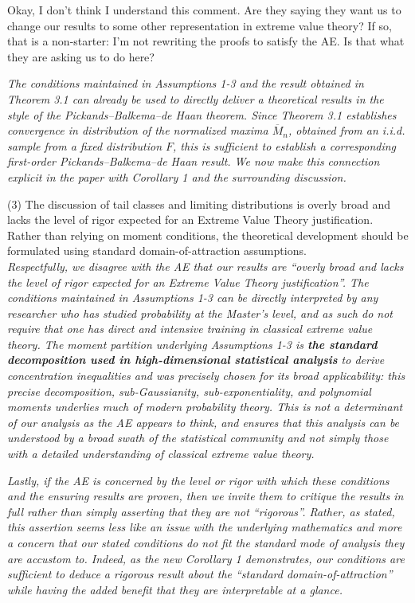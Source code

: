 \documentclass[a4paper,11pt]{article}
\begin{document}
{\color{red}Okay, I don't think I understand this comment. Are they saying they want us to change our results to some other representation in extreme value theory? If so, that is a non-starter: I'm not rewriting the proofs to satisfy the AE. Is that what they are asking us to do here?  }

\textit{The conditions maintained in Assumptions 1-3 and the result obtained in Theorem 3.1 can already be used to directly deliver a theoretical results in the style of the Pickands–Balkema–de Haan theorem. Since Theorem 3.1 establishes convergence in distribution of the normalized maxima $\overline{M}_n$, obtained from an i.i.d. sample from a fixed distribution \(F\), this is sufficient to establish a corresponding first-order Pickands–Balkema–de Haan result. We now make this connection explicit in the paper with Corollary 1 and the surrounding discussion.}

\noindent (3) The discussion of tail classes and limiting distributions is overly broad and lacks the level of rigor expected for an Extreme Value Theory justification. Rather than relying on moment conditions, the theoretical development should be formulated using standard domain-of-attraction assumptions.\\

\noindent\textit{Respectfully, we disagree with the AE that our results are ``overly broad and lacks the level of rigor expected for an Extreme Value Theory justification''. The conditions maintained in Assumptions 1-3 can be directly interpreted by any researcher who has studied probability at the Master's level, and as such do not require that one has direct and intensive training in classical extreme value theory. The moment partition underlying Assumptions 1-3 is \textbf{the standard decomposition used in high-dimensional statistical analysis} to derive concentration inequalities and was precisely chosen for its broad applicability: this precise decomposition, sub-Gaussianity, sub-exponentiality, and polynomial moments underlies much of modern probability theory. This is not a determinant of our analysis as the AE appears to think, and ensures that this analysis can be understood by a broad swath of the statistical community and not simply those with a detailed understanding of classical extreme value theory. }

\noindent\textit{Lastly, if the AE is concerned by the level or rigor with which these conditions and the ensuring results are proven, then we invite them to critique the results in full rather than simply asserting that they are not ``rigorous''. Rather, as stated, this assertion seems less like an issue with the underlying mathematics and more a concern that our stated conditions do not fit the standard mode of analysis they are accustom to. Indeed, as the new Corollary 1 demonstrates, our conditions are sufficient to deduce a rigorous result about the ``standard domain-of-attraction'' while having the added benefit that they are interpretable at a glance.}
\end{document}
